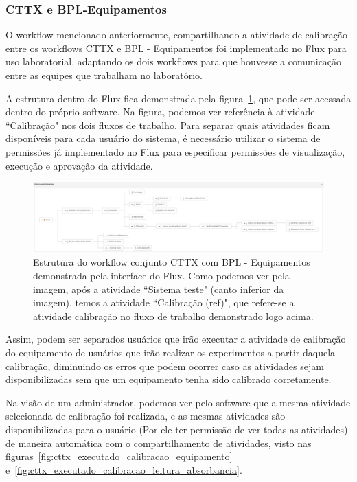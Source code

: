 \subsubsection{CTTX e BPL-Equipamentos}

O workflow mencionado anteriormente, compartilhando a atividade de calibração entre os workflows CTTX e BPL - Equipamentos foi implementado no Flux para uso laboratorial, adaptando os dois workflows para que houvesse a comunicação entre as equipes que trabalham no laboratório.

A estrutura dentro do Flux fica demonstrada pela figura~\ref{fig:cttx_bpl_flux}, que pode ser acessada dentro do próprio software. Na figura, podemos ver referência à atividade ``Calibração" nos dois fluxos de trabalho. Para separar quais atividades ficam disponíveis para cada usuário do sistema, é necessário utilizar o sistema de permissões já implementado no Flux para especificar permissões de visualização, execução e aprovação da atividade.

\begin{figure}
    \centering
    \includegraphics[width=1\textwidth]{imgs/CTTX-EQP/estrutura_cttx_eqp_flux.png}
    \caption{Estrutura do workflow conjunto CTTX com BPL - Equipamentos demonstrada pela interface do Flux. Como podemos ver pela imagem, após a atividade ``Sistema teste" (canto inferior da imagem), temos a atividade ``Calibração (ref)", que refere-se a atividade calibração no fluxo de trabalho demonstrado logo acima.}
    \label{fig:cttx_bpl_flux}
\end{figure}

Assim, podem ser separados usuários que irão executar a atividade de calibração do equipamento de usuários que irão realizar os experimentos a partir daquela calibração, diminuindo os erros que podem ocorrer caso as atividades sejam disponibilizadas sem que um equipamento tenha sido calibrado corretamente.

Na visão de um administrador, podemos ver pelo software que a mesma atividade selecionada de calibração foi realizada, e as mesmas atividades são disponibilizadas para o usuário (Por ele ter permissão de ver todas as atividades) de maneira automática com o compartilhamento de atividades, visto nas figuras~\ref{fig:cttx_executado_calibracao_equipamento} e~\ref{fig:cttx_executado_calibracao_leitura_absorbancia}.


